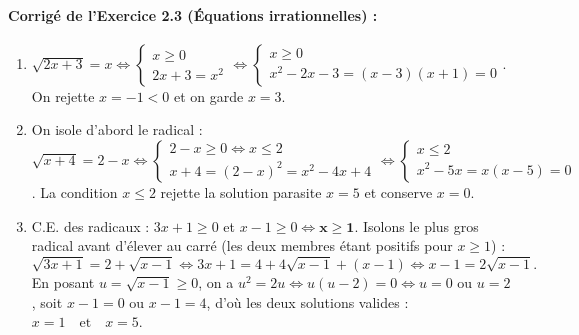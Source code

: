 \paragraph{Corrigé de l'Exercice 2.3 (Équations irrationnelles) :}
\begin{enumerate}[label=(\alph*)]
    \item $\sqrt{2x + 3} = x \iff \begin{cases} x \ge 0 \\ 2x + 3 = x^2 \end{cases} \iff \begin{cases} x \ge 0 \\ x^2 - 2x - 3 = (x - 3)(x + 1) = 0 \end{cases}$. On rejette $x = -1 < 0$ et on garde $\boxed{x = 3}$.
    \item On isole d'abord le radical : $\sqrt{x + 4} = 2 - x \iff \begin{cases} 2 - x \ge 0 \iff x \le 2 \\ x + 4 = (2 - x)^2 = x^2 - 4x + 4 \end{cases} \iff \begin{cases} x \le 2 \\ x^2 - 5x = x(x - 5) = 0 \end{cases}$. La condition $x \le 2$ rejette la solution parasite $x = 5$ et conserve $\boxed{x = 0}$.
    \item C.E. des radicaux : $3x + 1 \ge 0$ et $x - 1 \ge 0 \iff \mathbf{x \ge 1}$. Isolons le plus gros radical avant d'élever au carré (les deux membres étant positifs pour $x \ge 1$) :
    \[
        \sqrt{3x + 1} = 2 + \sqrt{x - 1} \iff 3x + 1 = 4 + 4\sqrt{x - 1} + (x - 1) \iff x - 1 = 2\sqrt{x - 1}.
    \]
    En posant $u = \sqrt{x - 1} \ge 0$, on a $u^2 = 2u \iff u(u - 2) = 0 \iff u = 0 \text{ ou } u = 2$, soit $x - 1 = 0$ ou $x - 1 = 4$, d'où les deux solutions valides : $\boxed{x = 1 \quad \text{et} \quad x = 5}$.
\end{enumerate}

